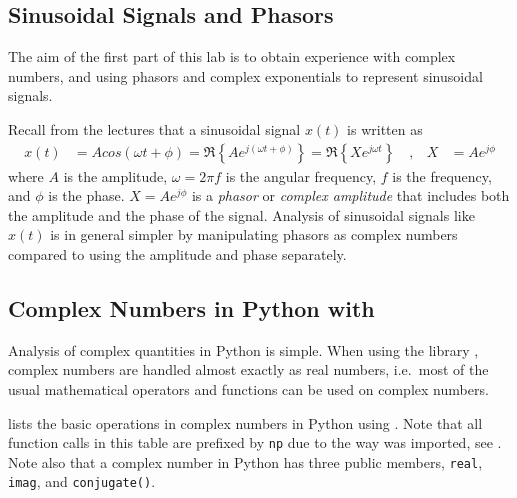\subsection{Sinusoidal Signals and Phasors}
The aim of the first part of this lab is to obtain experience with complex numbers, and using phasors and complex exponentials to represent sinusoidal signals.

Recall from the lectures that a sinusoidal signal $x(t)$ is written as 
\begin{align}
	x(t)&= A cos(\omega t + \phi) = \Re\left\{ A e^{j(\omega t + \phi)} \right\} 
		=  \Re\left\{ X e^{j\omega t} \right\} \quad , &
	X &= A e^{j\phi} 
\end{align}
where $A$ is the amplitude, $\omega = 2\pi f$ is the angular frequency, $f$ is the frequency, and $\phi$ is the phase. $	X = A e^{j\phi} $ is a \emph{phasor} or \emph{complex amplitude} that includes both the amplitude and the phase of the signal.
Analysis of sinusoidal signals like $x(t)$ is in general simpler by manipulating phasors as complex numbers compared to using the amplitude and phase separately.

\subsection{Complex Numbers in Python with \numpy}
Analysis of complex quantities in Python is simple. When using the library \numpy, complex numbers are handled almost exactly as real numbers, i.e.~most of the usual mathematical operators and functions can be used on complex numbers.

 lists the basic operations in complex numbers in Python using \numpy. Note that all function calls in this table are prefixed by \verb|np| due to the way \numpy was imported, see . Note also that a complex number in Python has three public members, \verb|real|, \verb|imag|, and \verb|conjugate()|.

